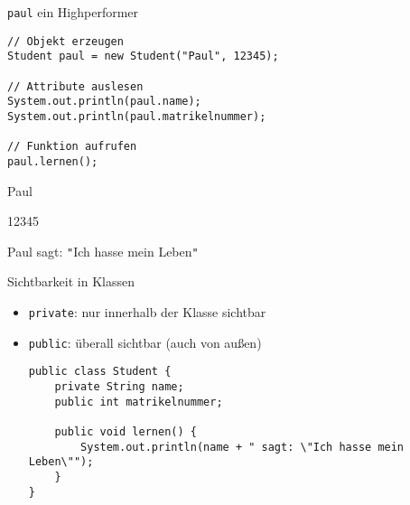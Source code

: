 \documentclass{../../presentation}
\begin{document}
\begin{frame}[fragile]{\texttt{paul} ein Highperformer}
	\begin{verbatim}
// Objekt erzeugen
Student paul = new Student("Paul", 12345);

// Attribute auslesen
System.out.println(paul.name);
System.out.println(paul.matrikelnummer);

// Funktion aufrufen
paul.lernen();
\end{verbatim}

	\begin{ausgabe}
		Paul

		12345

		Paul sagt: \texttt{"}Ich hasse mein Leben\texttt{"}
	\end{ausgabe}
\end{frame}



\begin{frame}[fragile]{Sichtbarkeit in Klassen}

	\begin{itemize}
		\item<2-> \texttt{private}: nur innerhalb der Klasse sichtbar
		\item<3-> \texttt{public}: überall sichtbar (auch von außen)
		      \begin{verbatim}
public class Student {
    private String name;         
    public int matrikelnummer;   

    public void lernen() {
        System.out.println(name + " sagt: \"Ich hasse mein Leben\"");
    }
}
\end{verbatim}
	\end{itemize}
\end{frame}
\end{document}
